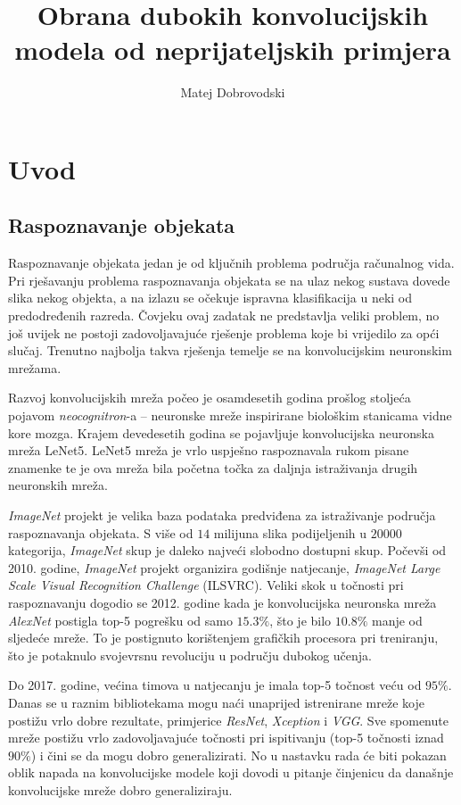 \documentclass[utf8, diplomski]{fer}
\begin{document}
\title{Obrana dubokih konvolucijskih modela od neprijateljskih primjera}
\author{Matej Dobrovodski}

\maketitle



\tableofcontents

\chapter{Uvod}
\section{Raspoznavanje objekata}
Raspoznavanje objekata jedan je od ključnih problema područja računalnog vida. Pri rješavanju problema raspoznavanja objekata se na ulaz nekog sustava dovede slika nekog objekta, a na izlazu se očekuje ispravna klasifikacija u neki od predodređenih razreda. Čovjeku ovaj zadatak ne predstavlja veliki problem, no još uvijek ne postoji zadovoljavajuće rješenje problema koje bi vrijedilo za opći slučaj. Trenutno najbolja takva rješenja temelje se na konvolucijskim neuronskim mrežama. \par
Razvoj konvolucijskih mreža počeo je osamdesetih godina prošlog stoljeća pojavom \textit{neocognitron}-a -- neuronske mreže inspirirane biološkim stanicama vidne kore mozga. Krajem devedesetih godina se pojavljuje konvolucijska neuronska mreža LeNet5. LeNet5 mreža je vrlo uspješno raspoznavala rukom pisane znamenke te je ova mreža bila početna točka za daljnja istraživanja drugih neuronskih mreža. \par
\textit{ImageNet}\citep{ILSVRC15} projekt je velika baza podataka predviđena za istraživanje područja raspoznavanja objekata. S više od $14$ milijuna slika podijeljenih u $20000$ kategorija, \textit{ImageNet} skup je daleko najveći slobodno dostupni skup. Počevši od 2010. godine, \textit{ImageNet} projekt organizira godišnje natjecanje, \textit{ImageNet Large Scale Visual Recognition Challenge} (ILSVRC). Veliki skok u točnosti pri raspoznavanju dogodio se 2012. godine kada je konvolucijska neuronska mreža \textit{AlexNet}\citep{alexnet} postigla top-5 pogrešku od samo $15.3\%$, što je bilo $10.8\%$ manje od sljedeće mreže. To je postignuto korištenjem grafičkih procesora pri treniranju, što je potaknulo svojevrsnu revoluciju u području dubokog učenja. \par
Do 2017. godine, većina timova u natjecanju je imala top-5 točnost veću od $95\%$. Danas se u raznim bibliotekama mogu naći unaprijed istrenirane mreže koje postižu vrlo dobre rezultate, primjerice \textit{ResNet}, \textit{Xception} i \textit{VGG}. Sve spomenute mreže postižu vrlo zadovoljavajuće točnosti pri ispitivanju (top-5 točnosti iznad $90\%$) i čini se da mogu dobro generalizirati. No u nastavku rada će biti pokazan oblik napada na konvolucijske modele koji dovodi u pitanje činjenicu da današnje konvolucijske mreže dobro generaliziraju.
\end{document}

